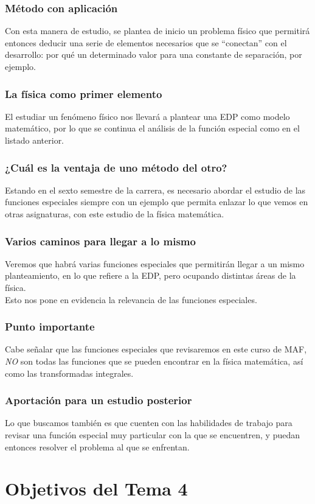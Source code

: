 \begin{frame}
\frametitle{Método con aplicación}
Con esta manera de estudio, se plantea de inicio un problema físico que permitirá entonces deducir una serie de elementos necesarios que se \enquote{conectan} con el desarrollo: por qué un determinado valor para una constante de separación, por ejemplo.
\end{frame}
\begin{frame}
\frametitle{La física como primer elemento}
El estudiar un fenómeno físico nos llevará a plantear una EDP como modelo matemático, por lo que se continua el análisis de la función especial como en el listado anterior.
\end{frame}
\begin{frame}
\frametitle{¿Cuál es la ventaja de uno método del otro?}
Estando en el sexto semestre de la carrera, es necesario abordar el estudio de las funciones especiales siempre con un ejemplo que permita enlazar lo que vemos en otras asignaturas, con este estudio de la física matemática.
\end{frame}
\begin{frame}
\frametitle{Varios caminos para llegar a lo mismo}
Veremos que habrá varias funciones especiales que permitirán llegar a un mismo planteamiento, en lo que refiere a la EDP, pero ocupando distintas áreas de la física.
\\
\bigskip
\pause
Esto nos pone en evidencia la relevancia de las funciones especiales.
\end{frame}
\begin{frame}
\frametitle{Punto importante}
Cabe señalar que las funciones especiales que revisaremos en este curso de MAF, \emph{NO} son todas las funciones que se pueden encontrar en la física matemática, así como las transformadas integrales.
\end{frame}
\begin{frame}
\frametitle{Aportación para un estudio posterior}
Lo que buscamos también es que cuenten con las habilidades de trabajo para revisar una función especial muy particular con la que se encuentren, y puedan entonces resolver el problema al que se enfrentan.
\end{frame}
\section{Objetivos del Tema 4}
